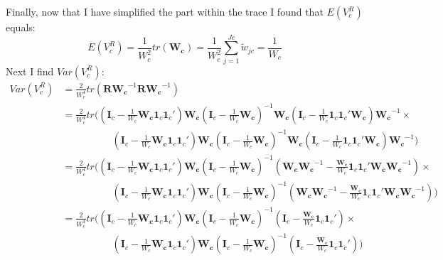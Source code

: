 Finally, now that I have simplified the part within the trace I found that $E(V^R_c)$ equals:
\begin{equation}
    E(V^R_c) = \frac{1}{W_c^2}tr(\mathbf{W_c}) = \frac{1}{W^2_c} \sum_{j=1}^{Jc} \tilde{w}_{jc} = \frac{1}{W_c}
    \nonumber
\end{equation}
Next I find  $Var(V^R_c)$:
\begin{equation}
    \begin{split}
         Var(V^R_c) & = \frac{2}{W_c^4} tr(\mathbf{R}\mathbf{W_c}^{-1}\mathbf{R}\mathbf{W_c}^{-1}) \\
         & = \frac{2}{W^4_c} tr\Bigg(\left(\mathbf{I}_c - \frac{1}{W_c} \mathbf{W_c} \mathbf{1}_c\mathbf{1}_c' \right) \mathbf{W_c} \left(\mathbf{I}_c - \frac{1}{W_c} \mathbf{W_c} \right)^{-1} \mathbf{W_c} \left(\mathbf{I}_c - \frac{1}{W_c}  \mathbf{1}_c\mathbf{1}_c' \mathbf{W_c}\right) \mathbf{W_c}^{-1} \times \\
          & \quad \quad \quad \quad \quad \left(\mathbf{I}_c - \frac{1}{W_c} \mathbf{W_c} \mathbf{1}_c\mathbf{1}_c' \right) \mathbf{W_c} \left(\mathbf{I}_c - \frac{1}{W_c} \mathbf{W_c} \right)^{-1} \mathbf{W_c} \left(\mathbf{I}_c - \frac{1}{W_c}  \mathbf{1}_c\mathbf{1}_c' \mathbf{W_c}\right) \mathbf{W_c}^{-1} \Bigg) \\
          & = \frac{2}{W_c^4} tr\Bigg(\left(\mathbf{I}_c - \frac{1}{W_c} \mathbf{W_c} \mathbf{1}_c\mathbf{1}_c' \right) \mathbf{W_c} \left(\mathbf{I}_c - \frac{1}{W_c} \mathbf{W_c} \right)^{-1}  \left(\mathbf{W_c}\mathbf{W_c}^{-1} - \frac{\mathbf{W_c}}{W_c}  \mathbf{1}_c\mathbf{1}_c' \mathbf{W_c}\mathbf{W_c}^{-1}\right)  \times \\
          & \quad \quad \quad \quad \quad \left(\mathbf{I}_c - \frac{1}{W_c} \mathbf{W_c} \mathbf{1}_c\mathbf{1}_c' \right) \mathbf{W_c} \left(\mathbf{I}_c - \frac{1}{W_c} \mathbf{W_c} \right)^{-1} \left(\mathbf{W_c}\mathbf{W_c}^{-1}  - \frac{\mathbf{W_c} }{W_c}  \mathbf{1}_c\mathbf{1}_c' \mathbf{W_c}\mathbf{W_c}^{-1}\right)  \Bigg) \\
          & = \frac{2}{W^4_c} tr\Bigg(\left(\mathbf{I}_c - \frac{1}{W_c} \mathbf{W_c} \mathbf{1}_c\mathbf{1}_c' \right) \mathbf{W_c} \left(\mathbf{I}_c - \frac{1}{W_c} \mathbf{W_c} \right)^{-1}  \left(\mathbf{I}_c - \frac{\mathbf{W_c}}{W_c}  \mathbf{1}_c\mathbf{1}_c' \right)  \times \\
          & \quad \quad \quad \quad \quad \left(\mathbf{I}_c - \frac{1}{W_c} \mathbf{W_c} \mathbf{1}_c\mathbf{1}_c' \right) \mathbf{W_c} \left(\mathbf{I}_c - \frac{1}{W_c} \mathbf{W_c} \right)^{-1} \left(\mathbf{I}_c  - \frac{\mathbf{W_c} }{W_c}  \mathbf{1}_c\mathbf{1}_c' \right)  \Bigg) \\

\end{split}
\end{equation}
